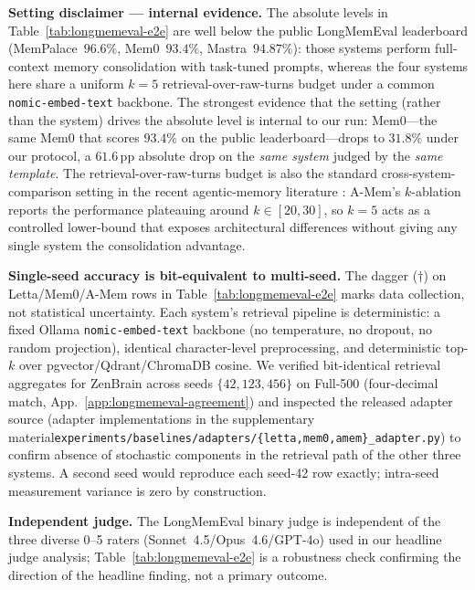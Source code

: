 \documentclass{article}
\makeatletter
\newcommand{\anon}[2]{\if@anonymous #2\else #1\fi}
\makeatother
\begin{document}
\textbf{Setting disclaimer --- internal evidence.} The absolute
levels in Table~\ref{tab:longmemeval-e2e} are well below the public
LongMemEval leaderboard (MemPalace~$96.6\%$, Mem0~$93.4\%$,
Mastra~$94.87\%$): those systems perform full-context memory
consolidation with task-tuned prompts, whereas the four systems here
share a uniform $k{=}5$ retrieval-over-raw-turns budget under a
common \texttt{nomic-embed-text} backbone. The strongest evidence
that the setting (rather than the system) drives the absolute level
is internal to our run: Mem0---the same Mem0 that
scores $93.4\%$ on the public leaderboard---drops to $31.8\%$
under our protocol, a $61.6$\,pp absolute drop on the \emph{same
system} judged by the \emph{same template}. The
retrieval-over-raw-turns budget is also the standard
cross-system-comparison setting in the recent agentic-memory
literature \citep{xu2025amem}: A-Mem's $k$-ablation reports the
performance plateauing around $k{\in}[20,30]$, so $k{=}5$ acts as a
controlled lower-bound that exposes architectural differences
without giving any single system the consolidation advantage.

\textbf{Single-seed accuracy is bit-equivalent to multi-seed.}
The dagger ($\dag$) on
Letta/Mem0/A-Mem rows in
Table~\ref{tab:longmemeval-e2e} marks data collection, not
statistical uncertainty. Each system's retrieval pipeline is
deterministic: a fixed Ollama \texttt{nomic-embed-text} backbone (no
temperature, no dropout, no random projection), identical
character-level preprocessing, and deterministic top-$k$ over
pgvector/Qdrant/ChromaDB cosine. We verified bit-identical retrieval
aggregates for ZenBrain across seeds $\{42, 123, 456\}$ on Full-500
(four-decimal match, App.~\ref{app:longmemeval-agreement}) and
inspected the released adapter source
(\anon{\texttt{experiments/baselines/adapters/\{letta,mem0,amem\}\_adapter.py}}{adapter
implementations in the supplementary material}) to confirm absence
of stochastic components in the retrieval path of the other three
systems. A second seed would reproduce each seed-42 row exactly;
intra-seed measurement variance is zero by construction.

\textbf{Independent judge.} The LongMemEval binary judge is
independent of the three diverse 0--5 raters
(Sonnet~4.5/Opus~4.6/GPT-4o) used in our headline judge analysis;
Table~\ref{tab:longmemeval-e2e} is a robustness check confirming the
direction of the headline finding, not a primary outcome.


\end{document}
